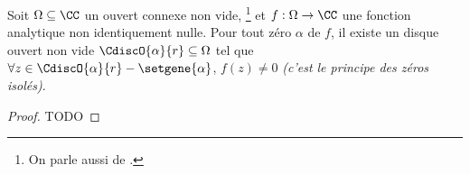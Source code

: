 \begin{fact} \label{isolated-zero}
    Soit $\Omega \subseteq \CC$ un ouvert connexe non vide,%
    \footnote{
    	On parle aussi de .
    }
    et
    $f: \Omega \rightarrow \CC$ une fonction analytique non identiquement nulle.
	Pour tout zéro $\alpha$ de $f$, il existe un disque ouvert non vide $\CdiscO{\alpha}{r} \subseteq \Omega$ tel que 
	$\forall z \in \CdiscO{\alpha}{r} - \setgene{\alpha}$, $f(z) \neq 0$
	\emph{(c'est le principe des zéros isolés)}.  
\end{fact}


\begin{proof}
	TODO
\end{proof}


%
%
%
%
